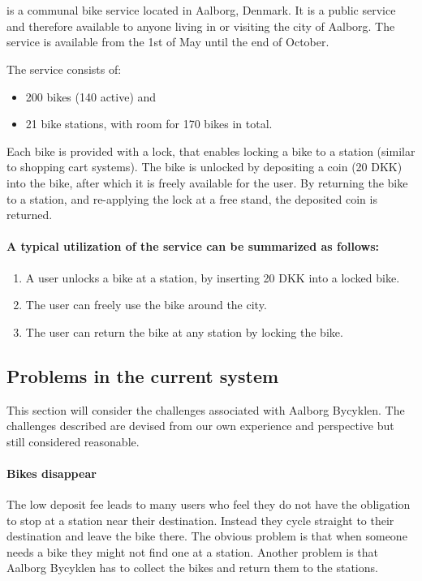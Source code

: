 \section{\citybike}\label{aalborg_bycyklen}
\citybike is a communal bike service located in Aalborg, Denmark.
It is a public service and therefore available to anyone living in or visiting the city of Aalborg.
The service is available from the 1st of May until the end of October.\cite{aalborgbycyklenbagcyklen}

\noindent The service consists of:
\begin{itemize}
\item 200 bikes (140 active) and 
\item 21 bike stations, with room for 170 bikes in total.
\end{itemize}
Each bike is provided with a lock, that enables locking a bike to a station (similar to shopping cart systems).
The bike is unlocked by depositing a coin (20 DKK) into the bike, after which it is freely available for the user.
By returning the bike to a station, and re-applying the lock at a free stand, the deposited coin is returned.

\paragraph{A typical utilization of the service can be summarized as follows:}
\begin{enumerate}
\item A user unlocks a bike at a station, by inserting 20 DKK into a locked bike.
\item The user can freely use the bike around the city.
\item The user can return the bike at any station by locking the bike.
\end{enumerate}

\subsection{Problems in the current system}\label{aalborg_bycyklen:challenges}
This section will consider the challenges associated with Aalborg Bycyklen.
The challenges described are devised from our own experience and perspective but still considered reasonable.

\paragraph{Bikes disappear}
The low deposit fee leads to many users who feel they do not have the obligation to stop at a station near their destination.
Instead they cycle straight to their destination and leave the bike there.
The obvious problem is that when someone needs a bike they might not find one at a station.
Another problem is that Aalborg Bycyklen has to collect the bikes and return them to the stations.

